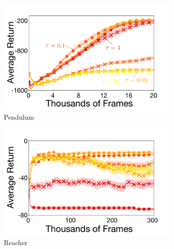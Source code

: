 \documentclass[twoside,11pt]{article}
\begin{document}

\begin{figure}[t]
  \centering
  \begin{subfigure}[b]{0.33\linewidth}
    \centering
    \includegraphics[width=\columnwidth]{figs/deep/continuous/PD_entropy_comparison.pdf} 
    \caption{Pendulum}\label{fig:pendulum}
  \end{subfigure}%
  \begin{subfigure}[b]{0.33\linewidth}
    \centering
    \includegraphics[width=\columnwidth]{figs/deep/continuous/Reacher_entropy_comparison.pdf} 
    \caption{Reacher}\label{fig:reacher}
  \end{subfigure}%
  \begin{subfigure}[b]{0.33\linewidth}

\end{subfigure}
\end{figure}
\end{document}
